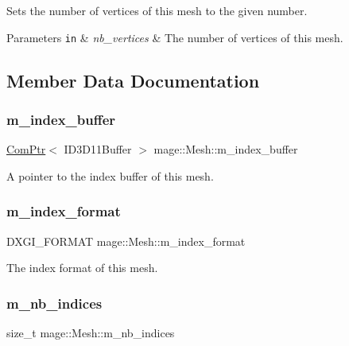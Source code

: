 Sets the number of vertices of this mesh to the given number.


\begin{DoxyParams}[1]{Parameters}
\mbox{\tt in}  & {\em nb\+\_\+vertices} & The number of vertices of this mesh. \\
\hline
\end{DoxyParams}


\subsection{Member Data Documentation}
\hypertarget{classmage_1_1_mesh_abe29363ebac77b284ca69532fd5b3373}{}\label{classmage_1_1_mesh_abe29363ebac77b284ca69532fd5b3373} 
\subsubsection{\texorpdfstring{m\+\_\+index\+\_\+buffer}{m\_index\_buffer}}
{\footnotesize\ttfamily \hyperlink{namespacemage_ae74f374780900893caa5555d1031fd79}{Com\+Ptr}$<$ I\+D3\+D11\+Buffer $>$ mage\+::\+Mesh\+::m\+\_\+index\+\_\+buffer\hspace{0.3cm}{\ttfamily [protected]}}

A pointer to the index buffer of this mesh. \hypertarget{classmage_1_1_mesh_acb99aac5dee4bb0553a20df4233a5b34}{}\label{classmage_1_1_mesh_acb99aac5dee4bb0553a20df4233a5b34} 
\subsubsection{\texorpdfstring{m\+\_\+index\+\_\+format}{m\_index\_format}}
{\footnotesize\ttfamily D\+X\+G\+I\+\_\+\+F\+O\+R\+M\+AT mage\+::\+Mesh\+::m\+\_\+index\+\_\+format\hspace{0.3cm}{\ttfamily [private]}}

The index format of this mesh. \hypertarget{classmage_1_1_mesh_a5e3baa9e2b2e9b4ce795a456f76d87b2}{}\label{classmage_1_1_mesh_a5e3baa9e2b2e9b4ce795a456f76d87b2} 
\subsubsection{\texorpdfstring{m\+\_\+nb\+\_\+indices}{m\_nb\_indices}}
{\footnotesize\ttfamily size\+\_\+t mage\+::\+Mesh\+::m\+\_\+nb\+\_\+indices\hspace{0.3cm}{\ttfamily [private]}}


